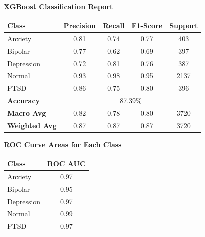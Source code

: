 \begin{center}
    \textbf{XGBoost Classification Report} \\[0.5em]
    \begin{tabular}{|l|c|c|c|c|}
        \hline
        \textbf{Class} & \textbf{Precision} & \textbf{Recall} & \textbf{F1-Score} & \textbf{Support} \\ \hline
        Anxiety        & 0.81               & 0.74            & 0.77              & 403              \\ \hline
        Bipolar        & 0.77               & 0.62            & 0.69              & 397              \\ \hline
        Depression     & 0.72               & 0.81            & 0.76              & 387              \\ \hline
        Normal         & 0.93               & 0.98            & 0.95              & 2137             \\ \hline
        PTSD           & 0.86               & 0.75            & 0.80              & 396              \\ \hline
        \textbf{Accuracy} & \multicolumn{4}{|c|}{87.39\%} \\ \hline
        \textbf{Macro Avg} & 0.82            & 0.78            & 0.80              & 3720             \\ \hline
        \textbf{Weighted Avg} & 0.87         & 0.87            & 0.87              & 3720             \\ \hline
    \end{tabular}
\end{center}

\vspace{0.25em}

\begin{center}
    \textbf{ROC Curve Areas for Each Class} \\[0.5em]
    \begin{tabular}{|l|c|}
        \hline
        \textbf{Class}  & \textbf{ROC AUC} \\ \hline
        Anxiety         & 0.97            \\ \hline
        Bipolar         & 0.95            \\ \hline
        Depression      & 0.97            \\ \hline
        Normal          & 0.99            \\ \hline
        PTSD            & 0.97            \\ \hline
    \end{tabular}
\end{center}

